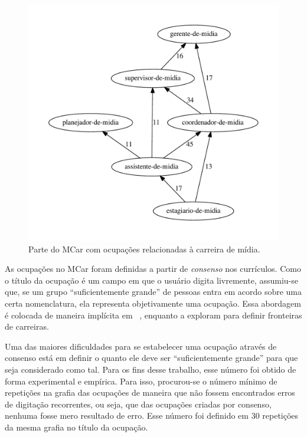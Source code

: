 \documentclass[
  article,
  11pt,
  a4paper,
  english,
  brazil,
  sumario=tradicional]{abntex2}
\begin{document}
\begin{figure}[ht]
  \centering
  \includegraphics[scale=0.6]{cluster_23.pdf}
  \caption{Parte do MCar com ocupações relacionadas à carreira de mídia.}
  \label{fig:ex-mapa-midia}
\end{figure}

As ocupações no MCar foram definidas a partir de \textit{consenso} nos currículos. Como o título da ocupação é um campo em que o usuário digita livremente, assumiu-se que, se um grupo \enquote{suficientemente grande} de pessoas entra em acordo sobre uma certa nomenclatura, ela representa objetivamente uma ocupação. Essa abordagem é colocada de maneira implícita em ~, enquanto  a exploram para definir fronteiras de carreiras.

Uma das maiores dificuldades para se estabelecer uma ocupação através de consenso está em definir o quanto ele deve ser \enquote{suficientemente grande} para que seja considerado como tal. Para os fins desse trabalho, esse número foi obtido de forma experimental e empírica. Para isso, procurou-se o número mínimo de repetições na grafia das ocupações de maneira que não fossem encontrados erros de digitação recorrentes, ou seja, que das ocupações criadas por consenso, nenhuma fosse mero resultado de erro. Esse número foi definido em 30 repetições da mesma grafia no título da ocupação.
\end{document}
